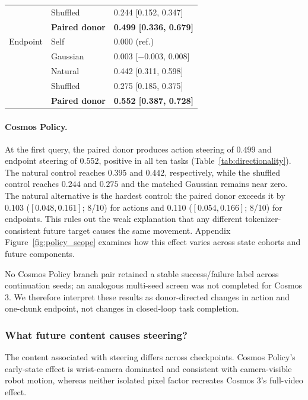 \documentclass{article}
\begin{document}
\begin{table}[t]
\begin{minipage}[t]{0.47\linewidth}
\begin{tabular}{@{}lll@{}}
      & Shuffled & 0.244 [0.152, 0.347] \\
      & \textbf{Paired donor} & \textbf{0.499 [0.336, 0.679]} \\
      \midrule
      Endpoint & Self & 0.000 (ref.) \\
      & Gaussian & 0.003 [$-0.003$, 0.008] \\
      & Natural & 0.442 [0.311, 0.598] \\
      & Shuffled & 0.275 [0.185, 0.375] \\
      & \textbf{Paired donor} & \textbf{0.552 [0.387, 0.728]} \\
      \bottomrule
    \end{tabular}
  \end{minipage}
\end{table}

\paragraph{Cosmos Policy.}
At the first query, the paired donor produces action steering of $0.499$ and endpoint steering of $0.552$, positive in all ten tasks (Table~\ref{tab:directionality}). The natural control reaches $0.395$ and $0.442$, respectively, while the shuffled control reaches $0.244$ and $0.275$ and the matched Gaussian remains near zero. The natural alternative is the hardest control: the paired donor exceeds it by $0.103$ ($[0.048,0.161]$; 8/10) for actions and $0.110$ ($[0.054,0.166]$; 8/10) for endpoints. This rules out the weak explanation that any different tokenizer-consistent future target causes the same movement. Appendix Figure~\ref{fig:policy_scope} examines how this effect varies across state cohorts and future components.

No Cosmos Policy branch pair retained a stable success/failure label across continuation seeds; an analogous multi-seed screen was not completed for Cosmos 3. We therefore interpret these results as donor-directed changes in action and one-chunk endpoint, not changes in closed-loop task completion.

\subsubsection{What future content causes steering?}
\label{sec:content}

The content associated with steering differs across checkpoints. Cosmos Policy's early-state effect is wrist-camera dominated and consistent with camera-visible robot motion, whereas neither isolated pixel factor recreates Cosmos 3's full-video effect.
\end{document}
